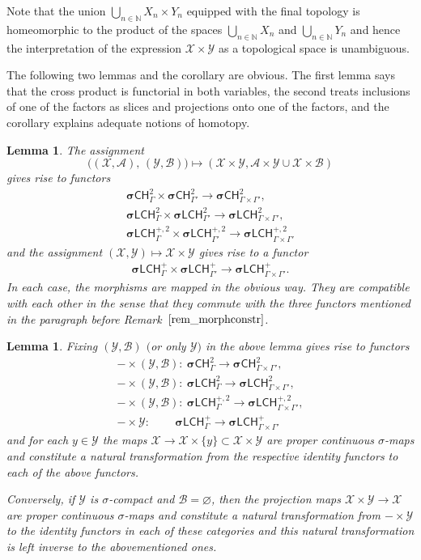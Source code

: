 \documentclass[pdftex]{sigma}
\numberwithin{equation}{section}
\newtheorem{lem}[thm]{Lemma}
\theoremstyle{definition}
\newcommand{\N}{\mathbb{N}}
\newcommand{\cX}{\mathcal{X}}
\newcommand{\cY}{\mathcal{Y}}
\newcommand{\cA}{\mathcal{A}}
\newcommand{\cB}{\mathcal{B}}
\newcommand{\categoryfont}[1]{\mathsf{#1}}
\newcommand{\sLCHz}[1][\Gamma]{\boldsymbol\sigma\categoryfont{LCH}_{#1}^2}
\newcommand{\sLCHp}[1][\Gamma]{\boldsymbol\sigma\categoryfont{LCH}_{#1}^+}
\newcommand{\sLCHzp}[1][\Gamma]{\boldsymbol\sigma\categoryfont{LCH}_{#1}^{+,2}}
\newcommand{\sCHz}[1][\Gamma]{\boldsymbol\sigma\categoryfont{CH}_{#1}^2}
\begin{document}
Note that the union $\bigcup_{n\in\N}X_n\times Y_n$ equipped with the final topology is homeomorphic to the product of the spaces $\bigcup_{n\in\N}X_n$ and $\bigcup_{n\in\N}Y_n$ and hence the interpretation of the expression $\cX\times\cY$ as a topological space is unambiguous.

The following two lemmas and the corollary are obvious. The first lemma says that the cross product is functorial in both variables, the second treats inclusions of one of the factors as slices and projections onto one of the factors, and the corollary explains adequate notions of homotopy.

\begin{lem}
The assignment
\[
\big((\cX,\cA),\,(\cY,\cB)\big)\mapsto (\cX\times\cY,\cA\times\cY\cup\cX\times\cB)
\]
gives rise to functors
\begin{gather*}
\sCHz\times\sCHz[\Gamma']\to \sCHz[\Gamma\times\Gamma'],
\\
\sLCHz\times\sLCHz[\Gamma']\to \sLCHz[\Gamma\times\Gamma'],
\\
\sLCHzp\times\sLCHzp[\Gamma']\to \sLCHzp[\Gamma\times\Gamma']
\end{gather*}
and the assignment $(\cX,\cY)\mapsto \cX\times \cY$ gives rise to a functor
\begin{gather*}
\sLCHp\times\sLCHp[\Gamma']\to \sLCHp[\Gamma\times\Gamma'].
\end{gather*}
In each case, the morphisms are mapped in the obvious way.
They are compatible with each other in the sense that they commute with the three functors mentioned in the paragraph before Remark~$\ref{rem_morphconstr}$.
\end{lem}

\begin{lem}
Fixing $(\cY,\cB)$ $($or only $\cY)$ in the above lemma gives rise to functors
\begin{gather*}
-\times(\cY,\cB)\colon\ \sCHz\to \sCHz[\Gamma\times\Gamma'],
\\
-\times(\cY,\cB)\colon\ \sLCHz\to \sLCHz[\Gamma\times\Gamma'],
\\
-\times(\cY,\cB)\colon\ \sLCHzp\to \sLCHzp[\Gamma\times\Gamma'],
\\
-\times\cY\colon\qquad\, \sLCHp\to \sLCHp[\Gamma\times\Gamma']
\end{gather*}
and for each $y\in \cY$ the maps $\cX\to \cX\times\{y\}\subset\cX\times\cY$ are proper continuous $\sigma$-maps and constitute a natural transformation from the respective identity functors to each of the above functors.

Conversely, if $\cY$ is $\sigma$-compact and $\cB=\varnothing$, then the projection maps $\cX\times\cY\to \cX$ are proper continuous $\sigma$-maps and constitute a natural transformation from $-\times\cY$ to the identity functors in each of these categories and this natural transformation is left inverse to the abovementioned ones.
\end{lem}
\end{document}
